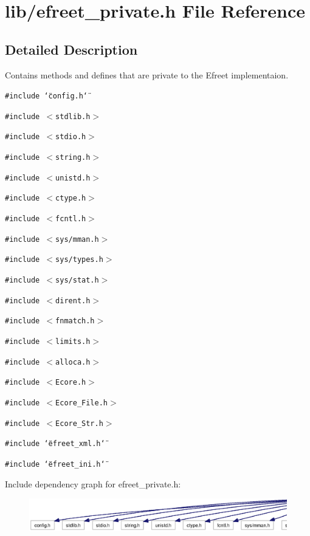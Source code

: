 \section{lib/efreet\_\-private.h File Reference}
\label{efreet__private_8h}


\subsection{Detailed Description}
Contains methods and defines that are private to the Efreet implementaion. 



{\tt \#include \char`\"{}config.h\char`\"{}}\par
{\tt \#include $<$stdlib.h$>$}\par
{\tt \#include $<$stdio.h$>$}\par
{\tt \#include $<$string.h$>$}\par
{\tt \#include $<$unistd.h$>$}\par
{\tt \#include $<$ctype.h$>$}\par
{\tt \#include $<$fcntl.h$>$}\par
{\tt \#include $<$sys/mman.h$>$}\par
{\tt \#include $<$sys/types.h$>$}\par
{\tt \#include $<$sys/stat.h$>$}\par
{\tt \#include $<$dirent.h$>$}\par
{\tt \#include $<$fnmatch.h$>$}\par
{\tt \#include $<$limits.h$>$}\par
{\tt \#include $<$alloca.h$>$}\par
{\tt \#include $<$Ecore.h$>$}\par
{\tt \#include $<$Ecore\_\-File.h$>$}\par
{\tt \#include $<$Ecore\_\-Str.h$>$}\par
{\tt \#include \char`\"{}efreet\_\-xml.h\char`\"{}}\par
{\tt \#include \char`\"{}efreet\_\-ini.h\char`\"{}}\par


Include dependency graph for efreet\_\-private.h:\nopagebreak
\begin{figure}[H]
\begin{center}
\leavevmode
\includegraphics[width=420pt]{efreet__private_8h__incl}
\end{center}
\end{figure}


